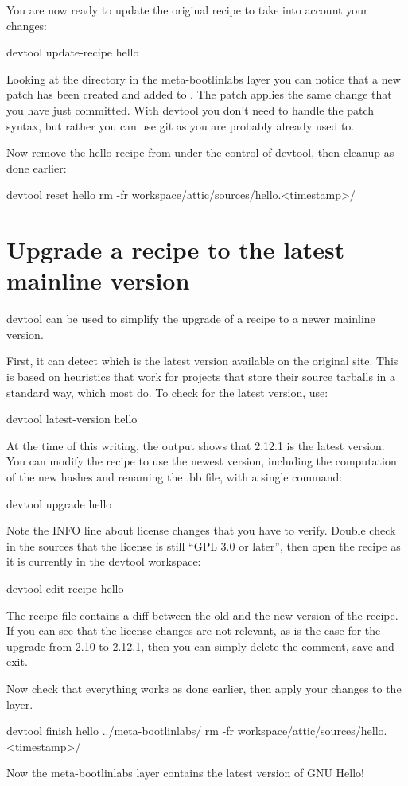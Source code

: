 You are now ready to update the original recipe to take into account your
changes:

\begin{bashinput}
devtool update-recipe hello
\end{bashinput}

Looking at the  directory in the meta-bootlinlabs
layer you can notice that a new patch has been created and added to
. The patch applies the same change that you have just
committed. With devtool you don't need to handle the patch syntax, but
rather you can use git as you are probably already used to.

Now remove the hello recipe from under the control of devtool, then cleanup
as done earlier:

\begin{bashinput}
devtool reset hello
rm -fr workspace/attic/sources/hello.<timestamp>/
\end{bashinput}

\section{Upgrade a recipe to the latest mainline version}

devtool can be used to simplify the upgrade of a recipe to a newer mainline
version.

First, it can detect which is the latest version available on the original
site. This is based on heuristics that work for projects that store their
source tarballs in a standard way, which most do. To check for the latest
version, use:
\begin{bashinput}
devtool latest-version hello
\end{bashinput}

At the time of this writing, the output shows that 2.12.1 is the latest
version. You can modify the recipe to use the newest version, including the
computation of the new hashes and renaming the .bb file, with a single
command:
\begin{bashinput}
devtool upgrade hello
\end{bashinput}

Note the INFO line about license changes that you have to verify. Double
check in the sources that the license is still ``GPL 3.0 or later'', then
open the recipe as it is currently in the devtool workspace:
\begin{bashinput}
devtool edit-recipe hello
\end{bashinput}

The recipe file contains a diff between the old and the new version of the
recipe. If you can see that the license changes are not relevant, as is the
case for the upgrade from 2.10 to 2.12.1, then you can simply delete the
comment, save and exit.

Now check that everything works as done earlier, then apply your changes to the layer.
\begin{bashinput}
devtool finish hello ../meta-bootlinlabs/
rm -fr workspace/attic/sources/hello.<timestamp>/
\end{bashinput}

Now the meta-bootlinlabs layer contains the latest version of GNU Hello!
